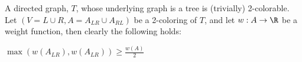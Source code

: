 \label{sec:bipartition}
A directed graph, $T$, whose underlying graph is a tree is (trivially) 2-colorable.
Let $(V = L \cup R, A = A_{LR} \cup A_{RL})$ be a 2-coloring of $T$, 
and let $w:A \rightarrow \R$ be a weight function, then clearly the following holds: 
\begin{observation}
\label{ob:bipartition}
$\max(w(A_{LR}), w(A_{LR})) \geq \frac{w(A)}{2}$
\end{observation}
